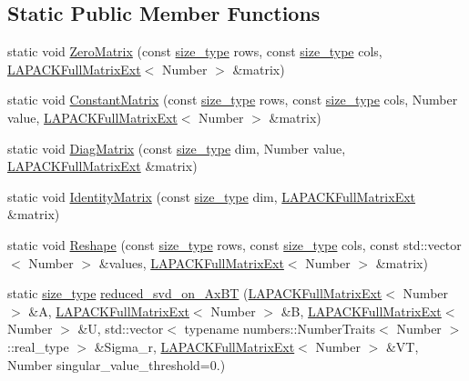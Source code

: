 \subsection*{Static Public Member Functions}
\begin{DoxyCompactItemize}
\item 
static void \hyperlink{classLAPACKFullMatrixExt_aa6aa6e0e7129f7f7de28ad8bf4ba7bec}{Zero\+Matrix} (const \hyperlink{classLAPACKFullMatrixExt_a5cf5f4a6104dc17029210b5ca52bf574}{size\+\_\+type} rows, const \hyperlink{classLAPACKFullMatrixExt_a5cf5f4a6104dc17029210b5ca52bf574}{size\+\_\+type} cols, \hyperlink{classLAPACKFullMatrixExt}{L\+A\+P\+A\+C\+K\+Full\+Matrix\+Ext}$<$ Number $>$ \&matrix)
\item 
static void \hyperlink{classLAPACKFullMatrixExt_a82a4dc9f9f5de6913e26f479eb3880f7}{Constant\+Matrix} (const \hyperlink{classLAPACKFullMatrixExt_a5cf5f4a6104dc17029210b5ca52bf574}{size\+\_\+type} rows, const \hyperlink{classLAPACKFullMatrixExt_a5cf5f4a6104dc17029210b5ca52bf574}{size\+\_\+type} cols, Number value, \hyperlink{classLAPACKFullMatrixExt}{L\+A\+P\+A\+C\+K\+Full\+Matrix\+Ext}$<$ Number $>$ \&matrix)
\item 
static void \hyperlink{classLAPACKFullMatrixExt_a2b8a0c3f7ef1c4ff97b8d16ce96084e5}{Diag\+Matrix} (const \hyperlink{classLAPACKFullMatrixExt_a5cf5f4a6104dc17029210b5ca52bf574}{size\+\_\+type} dim, Number value, \hyperlink{classLAPACKFullMatrixExt}{L\+A\+P\+A\+C\+K\+Full\+Matrix\+Ext} \&matrix)
\item 
static void \hyperlink{classLAPACKFullMatrixExt_a6599cc906b61cd77203daeeb06735daa}{Identity\+Matrix} (const \hyperlink{classLAPACKFullMatrixExt_a5cf5f4a6104dc17029210b5ca52bf574}{size\+\_\+type} dim, \hyperlink{classLAPACKFullMatrixExt}{L\+A\+P\+A\+C\+K\+Full\+Matrix\+Ext} \&matrix)
\item 
static void \hyperlink{classLAPACKFullMatrixExt_abae222273b3fd527dff492aed33c1b6e}{Reshape} (const \hyperlink{classLAPACKFullMatrixExt_a5cf5f4a6104dc17029210b5ca52bf574}{size\+\_\+type} rows, const \hyperlink{classLAPACKFullMatrixExt_a5cf5f4a6104dc17029210b5ca52bf574}{size\+\_\+type} cols, const std\+::vector$<$ Number $>$ \&values, \hyperlink{classLAPACKFullMatrixExt}{L\+A\+P\+A\+C\+K\+Full\+Matrix\+Ext}$<$ Number $>$ \&matrix)
\item 
static \hyperlink{classLAPACKFullMatrixExt_a5cf5f4a6104dc17029210b5ca52bf574}{size\+\_\+type} \hyperlink{classLAPACKFullMatrixExt_a355ed6360b21081b6e86e09833bf95db}{reduced\+\_\+svd\+\_\+on\+\_\+\+Ax\+BT} (\hyperlink{classLAPACKFullMatrixExt}{L\+A\+P\+A\+C\+K\+Full\+Matrix\+Ext}$<$ Number $>$ \&A, \hyperlink{classLAPACKFullMatrixExt}{L\+A\+P\+A\+C\+K\+Full\+Matrix\+Ext}$<$ Number $>$ \&B, \hyperlink{classLAPACKFullMatrixExt}{L\+A\+P\+A\+C\+K\+Full\+Matrix\+Ext}$<$ Number $>$ \&U, std\+::vector$<$ typename numbers\+::\+Number\+Traits$<$ Number $>$\+::real\+\_\+type $>$ \&Sigma\+\_\+r, \hyperlink{classLAPACKFullMatrixExt}{L\+A\+P\+A\+C\+K\+Full\+Matrix\+Ext}$<$ Number $>$ \&VT, Number singular\+\_\+value\+\_\+threshold=0.)

\end{DoxyCompactItemize}
